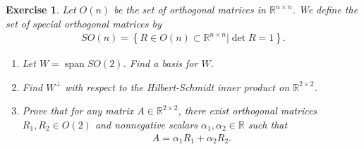 \documentclass[11pt]{article}
\newtheorem{exercise}{Exercise}[section]
\theoremstyle{definition}
\numberwithin{equation}{subsection}
\begin{document}
\begin{exercise}{\rm *}
Let $O(n)$ be the set of orthogonal matrices in $\mathbb{R}^{n \times n}$. We define the set of special orthogonal matrices by
\begin{align*}
    SO(n) = \left\{R \in O(n) \subset \mathbb{R}^{n \times n} | \det R = 1 \right\}.
\end{align*}
\begin{enumerate}[label=(\alph*)]
    \item Let $W = \operatorname{span} SO(2)$. Find a basis for $W$.
    
    \item Find $W^\bot$ with respect to the Hilbert-Schmidt inner product on $\mathbb{R}^{2 \times 2}$.
    
    \item Prove that for any matrix $A \in \mathbb{R}^{2 \times 2}$, there exist orthogonal matrices $R_1, R_2 \in O(2)$ and nonnegative scalars $\alpha_1, \alpha_2 \in \mathbb{R}$ such that
    \begin{align*}
        A = \alpha_1 R_1 + \alpha_2 R_2.
    \end{align*}
\end{enumerate}
\end{exercise}
\end{document}
